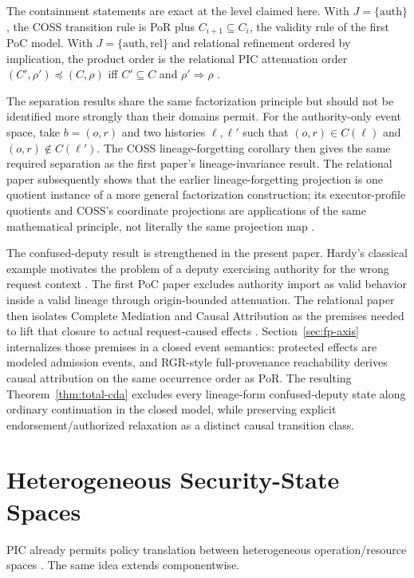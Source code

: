 \documentclass[10pt,twocolumn]{article}
\newcommand{\Model}{\textnormal{\textsc{COSS}}\xspace}
\begin{document}
The containment statements are exact at the level claimed here.  With
$J=\{\mathrm{auth}\}$, the \Model transition rule is PoR plus
$C_{i+1}\subseteq C_i$, the validity rule of the first PoC model.  With
$J=\{\mathrm{auth},\mathrm{rel}\}$ and relational refinement ordered by
implication, the product order is the relational PIC attenuation order
$(C',\rho')\preceq(C,\rho)$ iff $C'\subseteq C$ and
$\rho'\Rightarrow\rho$ \cite{gallo_relational2026}.

The separation results share the same factorization principle but should not be
identified more strongly than their domains permit.  For the authority-only
event space, take $b=(o,r)$ and two histories $\ell,\ell'$ such that
$(o,r)\in C(\ell)$ and $(o,r)\notin C(\ell')$.  The \Model
lineage-forgetting corollary then gives the same required separation as the
first paper's lineage-invariance result.  The relational paper subsequently
shows that the earlier lineage-forgetting projection is one quotient instance
of a more general factorization construction; its executor-profile quotients and
\Model's coordinate projections are applications of the same mathematical
principle, not literally the same projection map \cite{gallo_relational2026}.

The confused-deputy result is strengthened in the present paper. Hardy's
classical example motivates the problem of a deputy exercising authority for
the wrong request context \cite{hardy1988}. The first PoC paper excludes
authority import as valid behavior inside a valid lineage through origin-bounded
attenuation. The relational paper then isolates Complete Mediation and Causal
Attribution as the premises needed to lift that closure to actual request-caused
effects \cite{gallo_relational2026}. Section~\ref{sec:fp-axis} internalizes
those premises in a closed event semantics: protected effects are modeled
admission events, and RGR-style full-provenance reachability derives causal
attribution on the same occurrence order as PoR. The resulting
Theorem~\ref{thm:total-cda} excludes every lineage-form confused-deputy state
along ordinary continuation in the closed model, while preserving explicit endorsement/authorized
relaxation as a distinct causal transition class.

\section{Heterogeneous Security-State Spaces}

PIC already permits policy translation between heterogeneous operation/resource
spaces \cite{gallo_poc2026}.  The same idea extends componentwise.
\end{document}
